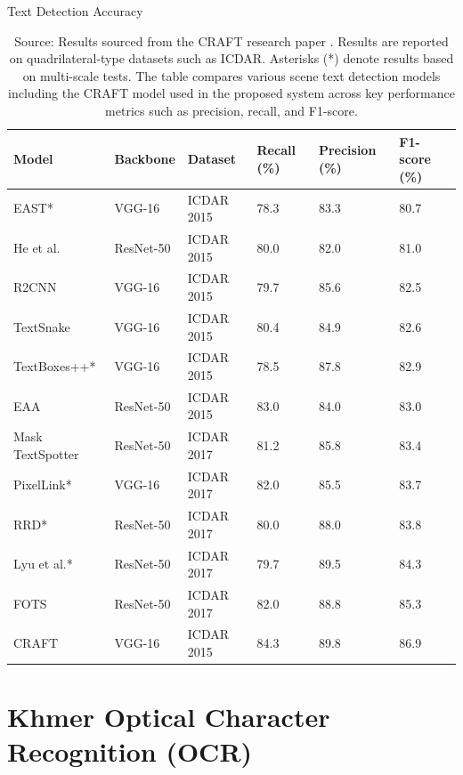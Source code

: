 {\begin{table}[H]
  \centering
  \caption{Text Detection Accuracy}
  \begin{tabularx}{\linewidth}{|L{3.5cm}|L{2.5cm}|L{2.5cm}|C{2cm}|C{2cm}|C{2cm}|}
    \hline
    \textbf{Model} & \textbf{Backbone} & \textbf{Dataset} & \textbf{Recall (\%)} & \textbf{Precision (\%)} & \textbf{F1-score (\%)} \\
    \hline
    EAST* & VGG-16 & ICDAR 2015 & 78.3 & 83.3 & 80.7 \\
    He et al. & ResNet-50 & ICDAR 2015 & 80.0 & 82.0 & 81.0 \\
    R2CNN & VGG-16 & ICDAR 2015 & 79.7 & 85.6 & 82.5 \\
    TextSnake & VGG-16 & ICDAR 2015 & 80.4 & 84.9 & 82.6 \\
    TextBoxes++* & VGG-16 & ICDAR 2015 & 78.5 & 87.8 & 82.9 \\
    EAA & ResNet-50 & ICDAR 2015 & 83.0 & 84.0 & 83.0 \\
    Mask TextSpotter & ResNet-50 & ICDAR 2017 & 81.2 & 85.8 & 83.4 \\
    PixelLink* & VGG-16 & ICDAR 2017 & 82.0 & 85.5 & 83.7 \\
    RRD* & ResNet-50 & ICDAR 2017 & 80.0 & 88.0 & 83.8 \\
    Lyu et al.* & ResNet-50 & ICDAR 2017 & 79.7 & 89.5 & 84.3 \\
    FOTS & ResNet-50 & ICDAR 2017 & 82.0 & 88.8 & 85.3 \\
    CRAFT & VGG-16 & ICDAR 2015 & 84.3 & 89.8 & 86.9 \\
    \hline
  \end{tabularx}
  \caption*{Source: Results sourced from the CRAFT research paper \cite{Hiremath_text_detection}. 
  Results are reported on quadrilateral-type datasets such as ICDAR. 
  Asterisks (*) denote results based on multi-scale tests. 
  The table compares various scene text detection models including the CRAFT model used in the proposed system across key performance metrics such as precision, recall, and F1-score.}
  \label{tab:text_detection_accuracy}
\end{table}

\vspace{1em}



\section{Khmer Optical Character Recognition (OCR)}
\label{sec:khmer_OCR_literature}

}
